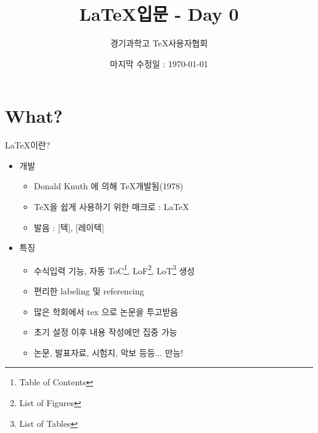 \documentclass[12pt]{beamer}
\title[\LaTeX - Day 0]{\LaTeX 입문 - Day 0}
\author{경기과학고 \TeX 사용자협회}
\institute[GSHSTeXSociety]{\url{latex.gs.hs.kr}}
\date{마지막 수정일 : \today}
\begin{document}
\begin{frame}
\titlepage %
\end{frame}

\section{What?}
\begin{frame}{\LaTeX 이란?}
	\begin{itemize}
		\item 개발
		\begin{itemize}
			\item Donald Knuth 에 의해 \TeX 개발됨(1978)
			\item \TeX 을 쉽게 사용하기 위한 매크로 : \LaTeX
			\item 발음 : [텍], [레이텍]
		\end{itemize}
		\item 특징
		\begin{itemize}
			\item 수식입력 기능, 자동 ToC\footnote{Table of Contents}, LoF\footnote{List of Figures}, LoT\footnote{List of Tables} 생성
			\item 편리한 labeling 및 referencing
			\item 많은 학회에서 tex 으로 논문을 투고받음
			\item 초기 설정 이후 내용 작성에만 집중 가능
			\item 논문, 발표자료, 시험지, 악보 등등... 만능!
		\end{itemize}
	\end{itemize}
\end{frame}
\end{document}
